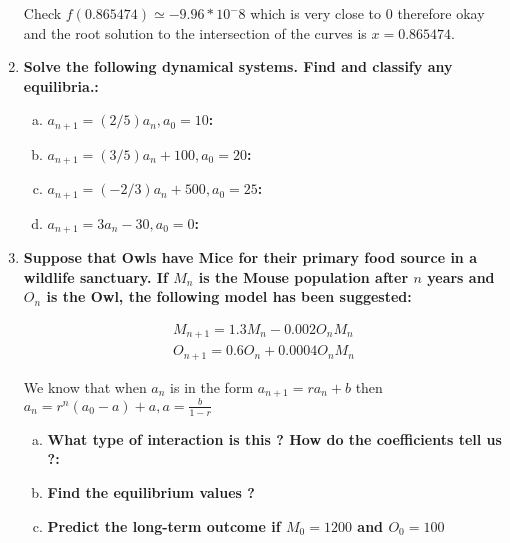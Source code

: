 \documentclass{article}
\begin{document}
\begin{enumerate}[1.]
Check $f(0.865474) \simeq -9.96 * 10^-8$ which is very close to 0 therefore okay and the root solution to the intersection of the curves is $x = 0.865474$.

\item
\textbf{Solve the following dynamical systems. Find and classify any equilibria.:}
\begin{enumerate}[(a)]
  \item \textbf{$a_{n+1} = (2/5)a_n, a_0 = 10$:} 
  \item \textbf{$a_{n+1} = (3/5)a_n + 100, a_0 = 20$:} 
  \item \textbf{$a_{n+1} = (-2/3)a_n + 500, a_0 = 25$:}
  \item \textbf{$a_{n+1} = 3a_n - 30, a_0 = 0$:}
\end{enumerate}

\item 
\textbf{Suppose that Owls have Mice for their primary food source in a wildlife sanctuary. If $M_n$ is the Mouse population after $n$ years and $O_n$ is the Owl, the following model has been suggested:}

\begin{gather*}
M_{n+1} = 1.3M_n - 0.002O_nM_n \\
O_{n+1} = 0.6O_n + 0.0004O_nM_n
\end{gather*}

We know that when $a_n$ is in the form $a_{n+1} = ra_n + b$ then $a_n = r^n(a_0 - a) + a, a = \frac{b}{1-r}$

\begin{enumerate}[(a)]
\item
\textbf{What type of interaction is this ? How do the coefficients tell us ?:}
\item
\textbf{Find the equilibrium values ?}
\item
\textbf{Predict the long-term outcome if $M_0 = 1200$ and $O_0 = 100$}
\end{enumerate}

\end{enumerate}
\end{document}
